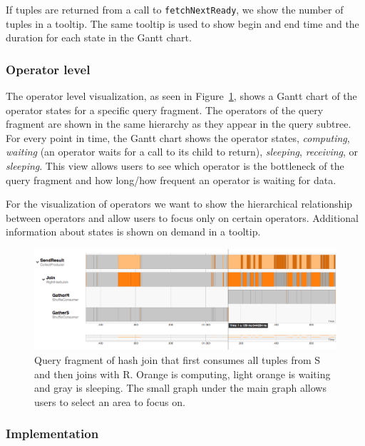 \documentclass[11pt]{scrartcl}
\begin{document}
If tuples are returned from a call to \texttt{fetchNextReady}, we show the number of tuples in a tooltip. The same tooltip is used to show begin and end time and the duration for each state in the Gantt chart.

\subsubsection{Operator level}

The operator level visualization, as seen in Figure~\ref{fig:gantt}, shows a Gantt chart of the operator states for a specific query fragment. The operators of the query fragment are shown in the same hierarchy as they appear in the query subtree. For every point in time, the Gantt chart shows the operator states, \emph{computing}, \emph{waiting} (an operator waits for a call to its child to return), \emph{sleeping}, \emph{receiving}, or \emph{sleeping}. This view allows users to see which operator is the bottleneck of the query fragment and how long/how frequent an operator is waiting for data.

For the visualization of operators we want to show the hierarchical relationship between operators and allow users to focus only on certain operators. Additional information about states is shown on demand in a tooltip.

\begin{figure}[h]
  \begin{center}
    \includegraphics[width=\textwidth]{join_gantt}
  \end{center}
  \caption{Query fragment of hash join that first consumes all tuples from S and then joins with R. Orange is computing, light orange is waiting and gray is sleeping. The small graph under the main graph allows users to select an area to focus on.}
  \label{fig:gantt}
\end{figure}


\subsubsection{Implementation}
\end{document}
